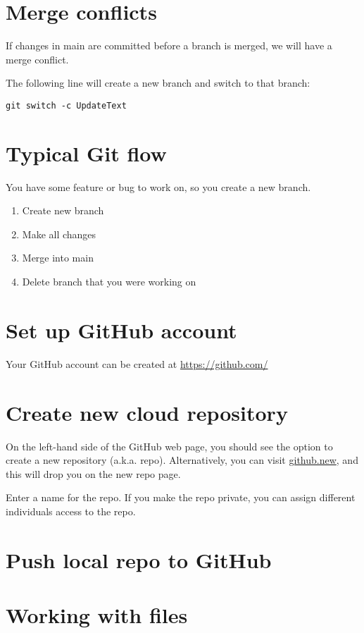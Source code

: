\documentclass[12pt]{article}
\begin{document}
\section{Merge conflicts}
If changes in main are committed before a branch is merged, we will have a merge conflict.\par
The following line will create a new branch and switch to that branch:
\begin{Verbatim}
git switch -c UpdateText
\end{Verbatim}

\section{Typical Git flow}
You have some feature or bug to work on, so you create a new branch.
\begin{enumerate}[nosep]
\item Create new branch
\item Make all changes
\item Merge into main
\item Delete branch that you were working on
\end{enumerate}


\section{Set up GitHub account}
Your GitHub account can be created at \href{https://github.com/}{https://github.com/}

\section{Create new cloud repository}
On the left-hand side of the GitHub web page, you should see the option to create a new repository (a.k.a. repo). Alternatively,  you can visit \href{github.new}{github.new}, and this will drop you on the new repo page.\par

Enter a name for the repo. If you make the repo private, you can assign different individuals access to the repo.

\section{Push local repo to GitHub}
\section{Working with files}
\end{document}
